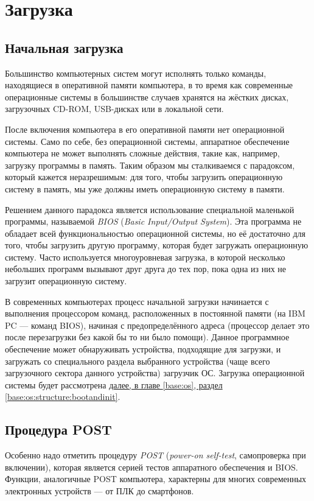 \section{Загрузка}\label{base:introduction:bootup}
\subsection{Начальная загрузка}\label{base:introduction:bootup:BIOS}
Большинство компьютерных систем могут исполнять только команды, находящиеся в оперативной памяти компьютера, в то время как современные операционные системы в большинстве случаев хранятся на жёстких дисках, загрузочных CD-ROM, USB-дисках или в локальной сети.

После включения компьютера в его оперативной памяти нет операционной системы. Само по себе, без операционной системы, аппаратное обеспечение компьютера не может выполнять сложные действия, такие как, например, загрузку программы в память.
Таким образом мы сталкиваемся с парадоксом, который кажется неразрешимым: для того, чтобы загрузить операционную систему в память, мы уже должны иметь операционную систему в памяти.

Решением данного парадокса является использование специальной маленькой программы, называемой \emph{BIOS} (\emph{Basic Input/Output System}). Эта программа не обладает всей функциональностью операционной системы, но её достаточно для того, чтобы загрузить другую программу, которая будет загружать операционную систему.
Часто используется многоуровневая загрузка, в которой несколько небольших программ вызывают друг друга до тех пор, пока одна из них не загрузит операционную систему.

В современных компьютерах процесс начальной загрузки начинается с выполнения процессором команд, расположенных в постоянной памяти (на IBM PC --- команд BIOS), начиная с предопределённого адреса (процессор делает это после перезагрузки без какой бы то ни было помощи).
Данное программное обеспечение может обнаруживать устройства, подходящие для загрузки, и загружать со специального раздела выбранного устройства (чаще всего загрузочного сектора данного устройства) загрузчик ОС. Загрузка операционной системы будет рассмотрена \hyperref[base:os:structure:bootandinit]{далее, в главе \ref*{base:os}, раздел \ref*{base:os:structure:bootandinit}}.

\subsection{Процедура POST}\label{base:introduction:bootup:post}
Особенно надо отметить процедуру \emph{POST} (\emph{power-on self-test}, самопроверка при включении), которая является серией тестов аппаратного обеспечения и BIOS. Функции, аналогичные POST компьютера, характерны для многих современных электронных устройств --- от ПЛК до смартфонов.

